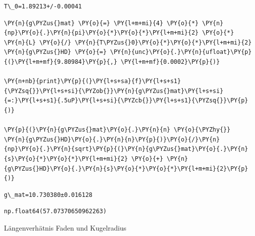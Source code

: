     \begin{Verbatim}[commandchars=\\\{\}]
T\_0=1.89213+/-0.00041
    \end{Verbatim}

    \begin{tcolorbox}[breakable, size=fbox, boxrule=1pt, pad at break*=1mm,colback=cellbackground, colframe=cellborder]
\begin{Verbatim}[commandchars=\\\{\}]
\PY{n}{g\PYZus{}mat} \PY{o}{=} \PY{l+m+mi}{4} \PY{o}{*} \PY{n}{np}\PY{o}{.}\PY{n}{pi}\PY{o}{*}\PY{o}{*}\PY{l+m+mi}{2} \PY{o}{*} \PY{n}{L} \PY{o}{/} \PY{n}{T\PYZus{}0}\PY{o}{*}\PY{o}{*}\PY{l+m+mi}{2}
\PY{n}{g\PYZus{}HD} \PY{o}{=} \PY{n}{unc}\PY{o}{.}\PY{n}{ufloat}\PY{p}{(}\PY{l+m+mf}{9.80984}\PY{p}{,} \PY{l+m+mf}{0.0002}\PY{p}{)}

\PY{n+nb}{print}\PY{p}{(}\PY{l+s+sa}{f}\PY{l+s+s1}{\PYZsq{}}\PY{l+s+si}{\PYZob{}}\PY{n}{g\PYZus{}mat}\PY{l+s+si}{=:}\PY{l+s+s1}{.5uP}\PY{l+s+si}{\PYZcb{}}\PY{l+s+s1}{\PYZsq{}}\PY{p}{)}

\PY{p}{(}\PY{n}{g\PYZus{}mat}\PY{o}{.}\PY{n}{n} \PY{o}{\PYZhy{}} \PY{n}{g\PYZus{}HD}\PY{o}{.}\PY{n}{n}\PY{p}{)}\PY{o}{/}\PY{n}{np}\PY{o}{.}\PY{n}{sqrt}\PY{p}{(}\PY{n}{g\PYZus{}mat}\PY{o}{.}\PY{n}{s}\PY{o}{*}\PY{o}{*}\PY{l+m+mi}{2} \PY{o}{+} \PY{n}{g\PYZus{}HD}\PY{o}{.}\PY{n}{s}\PY{o}{*}\PY{o}{*}\PY{l+m+mi}{2}\PY{p}{)}
\end{Verbatim}
\end{tcolorbox}

    \begin{Verbatim}[commandchars=\\\{\}]
g\_mat=10.730380±0.016128
    \end{Verbatim}

            \begin{tcolorbox}[breakable, size=fbox, boxrule=.5pt, pad at break*=1mm, opacityfill=0]
\begin{Verbatim}[commandchars=\\\{\}]
np.float64(57.07370650962263)
\end{Verbatim}
\end{tcolorbox}
        
    Längenverhätnis Faden und Kugelradius

